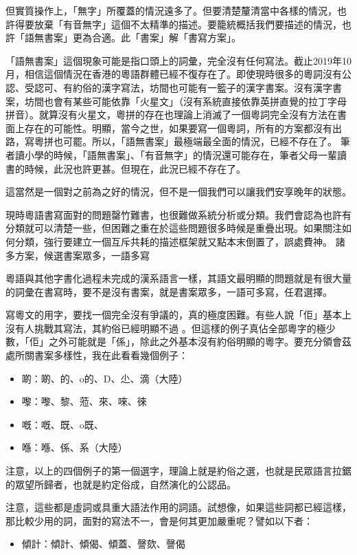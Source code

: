 \documentclass[a5paper, 12pt, openany]{book} %
\begin{document}
但實質操作上，「無字」所覆蓋的情況遠多了。但要清楚釐清當中各樣的情況，也許得要放棄「有音無字」這個不太精準的描述。要籠統概括我們要描述的情況，也許「語無書案」更為合適。此「書案」解「書寫方案」。

「語無書案」這個現象可能是指口頭上的詞彙，完全沒有任何寫法。截止2019年10月，相信這個情況在香港的粵語群體已經不復存在了。即使現時很多的粵詞沒有公認、受認可、有約俗的漢字寫法，坊間也可能有一籃子的漢字書案。沒有漢字書案，坊間也會有某些可能依靠「火星文」（沒有系統直接依靠英拼直覺的拉丁字母拼音）。就算沒有火星文，粵拼的存在也理論上消滅了一個粵詞完全沒有方法在書面上存在的可能性。明顯，當今之世，如果要寫一個粵詞，所有的方案都沒有出路，寫粵拼也可罷。所以，「語無書案」最極端最全面的情況，已經不存在了。 筆者讀小學的時候，「語無書案」、「有音無字」的情況還可能存在，筆者父母一輩讀書的時候，此況也許更甚。但現在，此況已經不存在了。 

這當然是一個對之前為之好的情況，但不是一個我們可以讓我們安享晚年的狀態。

現時粵語書寫面對的問題罄竹難書，也很難做系統分析或分類。我們會認為也許有分類就可以清楚一些，但困難之重在於這些問題很多時候是重疊出現。如果關注如何分類，強行要建立一個互斥共耗的描述框架就又點本末倒置了，誤處費神。
諸多方案，候選書案眾多，一語多寫

粵語與其他字書化過程未完成的漢系語言一樣，其語文最明顯的問題就是有很大量的詞彙在書寫時，要不是沒有書案，就是書案眾多，一語可多寫，任君選擇。

寫粵文的用字，要找一個完全沒有爭議的，真的極度困難。有些人說「佢」基本上沒有人挑戰其寫法，其約俗已經明顯不過 。但這樣的例子真佔全部粵字的極少數，「佢」之外可能就是「係」，除此之外基本沒有約俗明顯的粵字。要充分領會茲處所關書案多樣性，我在此看看幾個例子： 


\begin{itemize}
\item 啲：啲、的、o的、D、尐、滴（大陸）
\item 嚟：嚟、黎、蒞、來、唻、徠
\item 嘅：嘅、既、o既、
\item 喺：喺、係、系（大陸）
\end{itemize}

注意，以上的四個例子的第一個選字，理論上就是約俗之選，也就是民眾語言拉鋸的眾望所歸者，也就是約定俗成，自然演化的公認品。

注意，這些都是虛詞或具重大語法作用的詞語。試想像，如果這些詞都已經這樣，那比較少用的詞，面對的寫法不一，會是何其更加嚴重呢？譬如以下者：

\begin{itemize}
\item 傾計：傾計、傾偈、傾蓋、謦欬、謦偈
\end{itemize}
\end{document}

